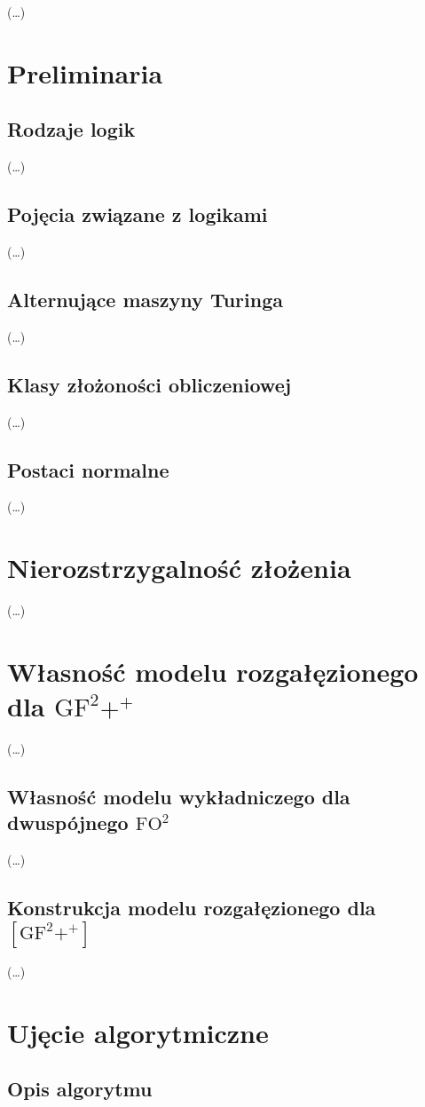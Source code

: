 \documentclass[a4paper]{article}
\begin{document}
(\dots)


\section{Preliminaria}\label{preliminaria}
\subsection{Rodzaje logik}
(\dots)
\subsection{Pojęcia związane z logikami}
(\dots)
\subsection{Alternujące maszyny Turinga}
(\dots)
\subsection{Klasy złożoności obliczeniowej}
(\dots)
\subsection{Postaci normalne}
(\dots)
\section{Nierozstrzygalność złożenia}\label{nierozstrzygalnosc-zlozenia}
(\dots)
\section{Własność modelu rozgałęzionego dla $\mathrm{GF^2+^+}$}\label{rozstrzygalnosc-fo2}
(\dots)
\subsection{Własność modelu wykładniczego dla dwuspójnego $\mathrm{FO^2}$}\label{fo2}
(\dots)
\subsection{Konstrukcja modelu rozgałęzionego dla $\mathrm{[GF^2 +^+]}$} \label{gf2proof}
(\dots)
\section{Ujęcie algorytmiczne}\label{algorytm}
\subsection{Opis algorytmu}
\end{document}
